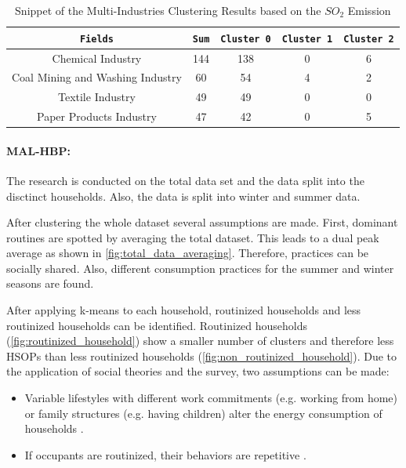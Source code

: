 \begin{table}[h]
    \centering
    \begin{tabular}{c|c|c|c|c}
        \texttt{Fields} & \texttt{Sum} & \texttt{Cluster 0} & \texttt{Cluster 1} & \texttt{Cluster 2} \\
        \hline
        Chemical Industry & 144 & 138 & 0 & 6 \\
        Coal Mining and Washing Industry & 60 & 54 & 4 & 2 \\
        Textile Industry & 49 & 49 & 0 & 0 \\
        Paper Products Industry & 47 & 42 & 0 & 5 \\
    \end{tabular}
    \caption{Snippet of the Multi-Industries Clustering Results based on the $SO_2$ Emission \cite{LIU-BDE}}
    \label{tab:multi_industries_clustering_results_based_on_the_so2_emission}
\end{table}

\paragraph*{MAL-HBP:}
The research is conducted on the total data set and the data split into the disctinct households.
Also, the data is split into winter and summer data.

After clustering the whole dataset several assumptions are made.
First, dominant routines are spotted by averaging the total dataset.
This leads to a dual peak average as shown in \autoref{fig:total_data_averaging}.
Therefore, practices can be socially shared.
Also, different consumption practices for the summer and winter seasons are found.

After applying k-means to each household, routinized households and less routinized households can be identified.
Routinized households (\autoref{fig:routinized_household}) show a smaller number of clusters and therefore less HSOPs than less routinized households (\autoref{fig:non_routinized_household}).
Due to the application of social theories and the survey, two assumptions can be made:
\begin{itemize}
    \item Variable lifestyles with different work commitments (e.g. working from home) or family structures (e.g. having children) alter the energy consumption of households \cite{KUR-HBP}.
    \item If occupants are routinized, their behaviors are repetitive \cite{BRE-EWP}.
\end{itemize}

